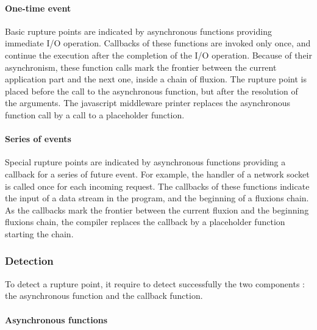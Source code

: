 \paragraph{One-time event} \label{sss:post}

Basic rupture points are indicated by asynchronous functions providing immediate I/O operation.
Callbacks of these functions are invoked only once, and continue the execution after the completion of the I/O operation.
Because of their asynchronism, these function calls mark the frontier between the current application part and the next one, inside a chain of fluxion.
The rupture point is placed before the call to the asynchronous function, but after the resolution of the arguments.
The javascript middleware printer replaces the asynchronous function call by a call to a placeholder function.

\paragraph{Series of events} \label{sss:start}

Special rupture points are indicated by asynchronous functions providing a callback for a series of future event.
For example, the handler of a network socket is called once for each incoming request.
The callbacks of these functions indicate the input of a data stream in the program, and the beginning of a fluxions chain.
As the callbacks mark the frontier between the current fluxion and the beginning fluxions chain, the compiler replaces the callback by a placeholder function starting the chain.

\subsubsection{Detection}

To detect a rupture point, it require to detect successfully the two components : the asynchronous function and the callback function.

\paragraph{Asynchronous functions}

